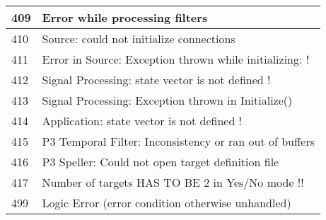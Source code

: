 {{\begin{tabular}{|l|l|}
  \hline
  409 & Error while processing filters \\
  \hline
  410 & Source: could not initialize connections \\
  \hline
  411 & Error in Source: Exception thrown while initializing: !\\
  \hline
  412 & Signal Processing: state vector is not defined ! \\
  \hline
  413 & Signal Processing: Exception thrown in Initialize() \\
  \hline
  414 & Application: state vector is not defined ! \\
  \hline
  415 & P3 Temporal Filter: Inconsistency or ran out of buffers \\
  \hline
  416 & P3 Speller: Could not open target definition file \\
  \hline
  417 & Number of targets HAS TO BE 2 in Yes/No mode !! \\
  \hline
  499 & Logic Error (error condition otherwise unhandled) \\
  \hline
 \end{tabular}
 \label{stat_info_mess}
 }
}
